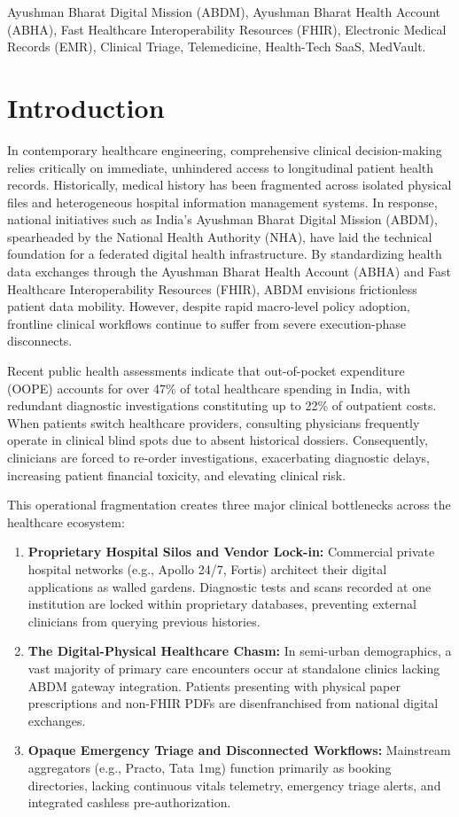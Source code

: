 \documentclass[conference]{IEEEtran}
\begin{document}
\begin{IEEEkeywords}
Ayushman Bharat Digital Mission (ABDM), Ayushman Bharat Health Account (ABHA), Fast Healthcare Interoperability Resources (FHIR), Electronic Medical Records (EMR), Clinical Triage, Telemedicine, Health-Tech SaaS, MedVault.
\end{IEEEkeywords}

\section{Introduction}
In contemporary healthcare engineering, comprehensive clinical decision-making relies critically on immediate, unhindered access to longitudinal patient health records. Historically, medical history has been fragmented across isolated physical files and heterogeneous hospital information management systems. In response, national initiatives such as India's Ayushman Bharat Digital Mission (ABDM), spearheaded by the National Health Authority (NHA), have laid the technical foundation for a federated digital health infrastructure. By standardizing health data exchanges through the Ayushman Bharat Health Account (ABHA) and Fast Healthcare Interoperability Resources (FHIR), ABDM envisions frictionless patient data mobility. However, despite rapid macro-level policy adoption, frontline clinical workflows continue to suffer from severe execution-phase disconnects.

Recent public health assessments indicate that out-of-pocket expenditure (OOPE) accounts for over 47\% of total healthcare spending in India, with redundant diagnostic investigations constituting up to 22\% of outpatient costs. When patients switch healthcare providers, consulting physicians frequently operate in clinical blind spots due to absent historical dossiers. Consequently, clinicians are forced to re-order investigations, exacerbating diagnostic delays, increasing patient financial toxicity, and elevating clinical risk.

This operational fragmentation creates three major clinical bottlenecks across the healthcare ecosystem:
\begin{enumerate}
    \item \textbf{Proprietary Hospital Silos and Vendor Lock-in:} Commercial private hospital networks (e.g., Apollo 24/7, Fortis) architect their digital applications as walled gardens. Diagnostic tests and scans recorded at one institution are locked within proprietary databases, preventing external clinicians from querying previous histories.
    \item \textbf{The Digital-Physical Healthcare Chasm:} In semi-urban demographics, a vast majority of primary care encounters occur at standalone clinics lacking ABDM gateway integration. Patients presenting with physical paper prescriptions and non-FHIR PDFs are disenfranchised from national digital exchanges.
    \item \textbf{Opaque Emergency Triage and Disconnected Workflows:} Mainstream aggregators (e.g., Practo, Tata 1mg) function primarily as booking directories, lacking continuous vitals telemetry, emergency triage alerts, and integrated cashless pre-authorization.
\end{enumerate}
\end{document}
